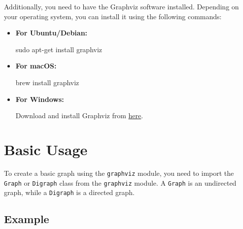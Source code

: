 \documentclass[
  letterpaper,
  DIV=11,
  numbers=noendperiod]{scrreprt}
\newenvironment{Shaded}{\begin{snugshade}}{\end{snugshade}}
\newcommand{\ExtensionTok}[1]{\textcolor[rgb]{0.00,0.23,0.31}{#1}}
\newcommand{\FunctionTok}[1]{\textcolor[rgb]{0.28,0.35,0.67}{#1}}
\newcommand{\NormalTok}[1]{\textcolor[rgb]{0.00,0.23,0.31}{#1}}
\begin{document}
Additionally, you need to have the Graphviz software installed.
Depending on your operating system, you can install it using the
following commands:

\begin{itemize}
\item
  \textbf{For Ubuntu/Debian:}

\begin{Shaded}
\begin{Highlighting}[]
\FunctionTok{sudo}\NormalTok{ apt{-}get install graphviz}
\end{Highlighting}
\end{Shaded}
\item
  \textbf{For macOS:}

\begin{Shaded}
\begin{Highlighting}[]
\ExtensionTok{brew}\NormalTok{ install graphviz}
\end{Highlighting}
\end{Shaded}
\item
  \textbf{For Windows:}

  Download and install Graphviz from
  \href{https://graphviz.gitlab.io/download/}{here}.
\end{itemize}

\section{Basic Usage}\label{basic-usage-5}

To create a basic graph using the \texttt{graphviz} module, you need to
import the \texttt{Graph} or \texttt{Digraph} class from the
\texttt{graphviz} module. A \texttt{Graph} is an undirected graph, while
a \texttt{Digraph} is a directed graph.

\subsection{Example}\label{example-40}
\end{document}
